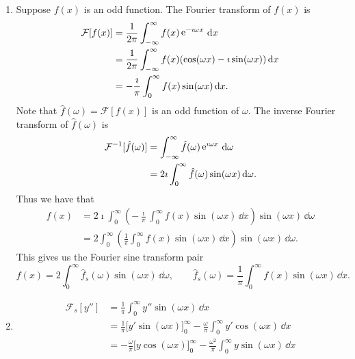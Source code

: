 {%
\begin{Solution}
  \label{solution ode ft ifst f''}
  \begin{enumerate}
  \item
    Suppose $f(x)$ is an odd function.  The Fourier transform of $f(x)$ is
    \begin{align*}
      \mathcal{F}[f(x)] 
      &= \frac{1}{2\pi} \int_{-\infty}^\infty f(x) \mathop{\mathrm{e}}\nolimits^{-\imath \omega x}\,\mathrm{d} x 
      \\
      &= \frac{1}{2\pi} \int_{-\infty}^\infty f(x) (\cos(\omega x) - \imath \sin(\omega x))\,\mathrm{d} x 
      \\
      &= - \frac{\imath}{\pi} \int_0^\infty f(x) \sin(\omega x)\,\mathrm{d} x.
    \end{align*}
    Note that $\hat{f}(\omega) = \mathcal{F}[f(x)]$ is an odd function of $\omega$.  
    The inverse Fourier transform of $\hat{f}(\omega)$ is
    \begin{align*}
      \mathcal{F}^{-1}[\hat{f}(\omega)]
      &= \int_{-\infty}^\infty \hat{f}(\omega) \mathop{\mathrm{e}}\nolimits^{\imath \omega x}\,\mathrm{d} \omega 
      \\
      &= 2 \imath \int_0^\infty \hat{f}(\omega) \sin(\omega x)\,\mathrm{d} \omega.
    \end{align*}
    Thus we have that 
    \begin{align*}
      f(x)    
      &= 2 \imath \int_0^\infty \left( - \frac{\imath}{\pi} \int_0^\infty f(x) \sin(\omega x)
        \,\dd x \right) \sin(\omega x)\,\dd \omega 
      \\
      &= 2 \int_0^\infty \left( \frac{1}{\pi} \int_0^\infty f(x) \sin(\omega x)\,\dd x
      \right) \sin(\omega x) \,\dd \omega.
    \end{align*}
    This gives us the Fourier sine transform pair
    \[ 
    \boxed{
      f(x) = 2 \int_0^\infty \hat{f}_s(\omega) \sin(\omega x)\,\dd \omega, \qquad 
      \hat{f}_s(\omega) = \frac{1}{\pi} \int_0^\infty f(x)\sin(\omega x)\,\dd x.
      }
    \]
  \item
    \begin{align*}
      \mathcal{F}_s[y'']
      &= \frac{1}{\pi} \int_0^\infty y'' \sin(\omega x)\,\dd x 
      \\
      &= \frac{1}{\pi} \Big[y' \sin(\omega x)\Big]_0^\infty 
      - \frac{\omega}{\pi} \int_0^\infty y' \cos(\omega x)\,\dd x 
      \\
      &= - \frac{\omega}{\pi}\Big[y \cos(\omega x)\Big]_0^\infty 
      - \frac{\omega^2} {\pi} \int_0^\infty y \sin(\omega x)\,\dd x 

\end{align*}
\end{enumerate}
\end{Solution}}
